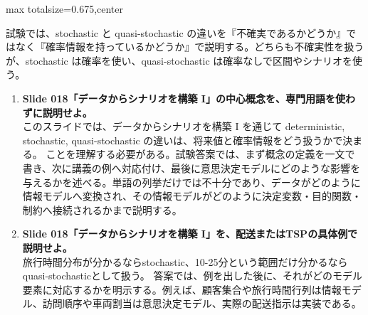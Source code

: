 \begin{adjustbox}{max totalsize={\textwidth}{0.675\textheight},center}
\begin{minipage}{\textwidth}
\begin{minipage}[t]{0.485\textwidth}
試験では、stochastic と quasi-stochastic の違いを『不確実であるかどうか』ではなく『確率情報を持っているかどうか』で説明する。どちらも不確実性を扱うが、stochastic は確率を使い、quasi-stochastic は確率なしで区間やシナリオを使う。\par
{}
\begin{enumerate}
\item \textbf{Slide 018「データからシナリオを構築 I」の中心概念を、専門用語を使わずに説明せよ。}\\このスライドでは、データからシナリオを構築 I を通じて deterministic, stochastic, quasi-stochastic の違いは、将来値と確率情報をどう扱うかで決まる。 ことを理解する必要がある。試験答案では、まず概念の定義を一文で書き、次に講義の例へ対応付け、最後に意思決定モデルにどのような影響を与えるかを述べる。単語の列挙だけでは不十分であり、データがどのように情報モデルへ変換され、その情報モデルがどのように決定変数・目的関数・制約へ接続されるかまで説明する。
\item \textbf{Slide 018「データからシナリオを構築 I」を、配送またはTSPの具体例で説明せよ。}\\旅行時間分布が分かるならstochastic、10-25分という範囲だけ分かるならquasi-stochasticとして扱う。 答案では、例を出した後に、それがどのモデル要素に対応するかを明示する。例えば、顧客集合や旅行時間行列は情報モデル、訪問順序や車両割当は意思決定モデル、実際の配送指示は実装である。
\end{enumerate}
\end{minipage}
\end{minipage}
\end{adjustbox}

